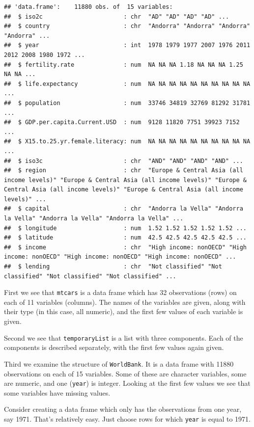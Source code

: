 \documentclass[
]{krantz}
\begin{document}
\begin{verbatim}
## 'data.frame':    11880 obs. of  15 variables:
##  $ iso2c                       : chr  "AD" "AD" "AD" "AD" ...
##  $ country                     : chr  "Andorra" "Andorra" "Andorra" "Andorra" ...
##  $ year                        : int  1978 1979 1977 2007 1976 2011 2012 2008 1980 1972 ...
##  $ fertility.rate              : num  NA NA NA 1.18 NA NA NA 1.25 NA NA ...
##  $ life.expectancy             : num  NA NA NA NA NA NA NA NA NA NA ...
##  $ population                  : num  33746 34819 32769 81292 31781 ...
##  $ GDP.per.capita.Current.USD  : num  9128 11820 7751 39923 7152 ...
##  $ X15.to.25.yr.female.literacy: num  NA NA NA NA NA NA NA NA NA NA ...
##  $ iso3c                       : chr  "AND" "AND" "AND" "AND" ...
##  $ region                      : chr  "Europe & Central Asia (all income levels)" "Europe & Central Asia (all income levels)" "Europe & Central Asia (all income levels)" "Europe & Central Asia (all income levels)" ...
##  $ capital                     : chr  "Andorra la Vella" "Andorra la Vella" "Andorra la Vella" "Andorra la Vella" ...
##  $ longitude                   : num  1.52 1.52 1.52 1.52 1.52 ...
##  $ latitude                    : num  42.5 42.5 42.5 42.5 42.5 ...
##  $ income                      : chr  "High income: nonOECD" "High income: nonOECD" "High income: nonOECD" "High income: nonOECD" ...
##  $ lending                     : chr  "Not classified" "Not classified" "Not classified" "Not classified" ...
\end{verbatim}

First we see that \texttt{mtcars} is a data frame which has 32 observations (rows) on each of 11 variables (columns). The names of the variables are given, along with their type (in this case, all numeric), and the first few values of each variable is given.

Second we see that \texttt{temporaryList} is a list with three components. Each of the components is described separately, with the first few values again given.

Third we examine the structure of \texttt{WorldBank}. It is a data frame with 11880 observations on each of 15 variables. Some of these are character variables, some are numeric, and one (\texttt{year}) is integer. Looking at the first few values we see that some variables have missing values.

Consider creating a data frame which only has the observations from one year, say 1971. That's relatively easy. Just choose rows for which \texttt{year} is equal to 1971.
\end{document}
